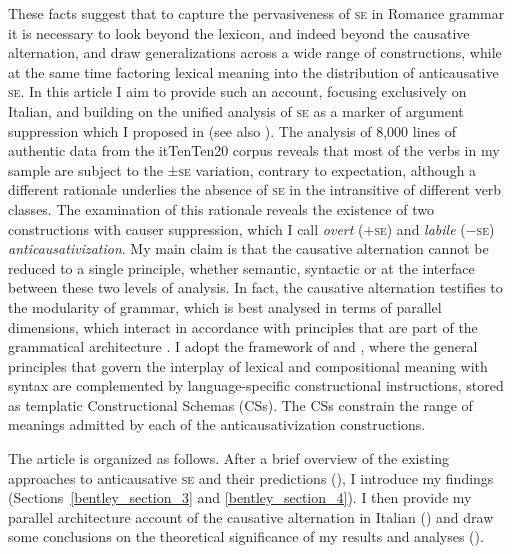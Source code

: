 \documentclass[output=paper,colorlinks,citecolor=brown
]{langscibook}
\begin{document}
These facts suggest that to capture the pervasiveness of \textsc{se} in Romance grammar it is necessary to look beyond the lexicon, and indeed beyond the causative alternation, and draw generalizations across a wide range of constructions, while at the same time factoring lexical meaning into the distribution of anticausative \textsc{se}. In this article I aim to provide such an account, focusing exclusively on Italian, and building on the unified analysis of \textsc{se} as a marker of argument suppression which I proposed in \citet{bentley2006split} (see also \cite{vanvalin1990semantic,centineo1995distribution}). The analysis of 8,000 lines of authentic data from the itTenTen20 corpus \citep{jakubicek2013tenten} reveals that most of the verbs in my sample are subject to the ±\textsc{se} variation, contrary to expectation, although a different rationale underlies the absence of \textsc{se} in the intransitive of different verb classes.  The examination of this rationale reveals the existence of two constructions with causer suppression, which I call \textit{overt} (+\textsc{se}) and \textit{labile} (−\textsc{se}) \textit{anticausativization}. My main claim is that the causative alternation cannot be reduced to a single principle, whether semantic, syntactic or at the interface between these two levels of analysis. In fact, the causative alternation testifies to the modularity of grammar, which is best analysed in terms of parallel dimensions, which interact in accordance with principles that are part of the grammatical architecture \citep{bresnan1989locative,vanvalin1997syntax,jackendoff2002foundations,vanvalin2005exploring,vanvalin2023principles}. I adopt the framework of \citet{vanvalin1997syntax} and \citet{vanvalin2005exploring,vanvalin2023principles}, where the general principles that govern the interplay of lexical and compositional meaning with syntax are complemented by language-specific constructional instructions, stored as templatic Constructional Schemas (CSs). The CSs constrain the range of meanings admitted by each of the anticausativization constructions. 

The article is organized as follows. After a brief overview of the existing approaches to anticausative \textsc{se} and their predictions (), I introduce my findings (Sections~\ref{bentley_section_3} and \ref{bentley_section_4}). I then provide my parallel architecture account of the causative alternation in Italian () and draw some conclusions on the theoretical significance of my results and analyses (). 
\end{document}
